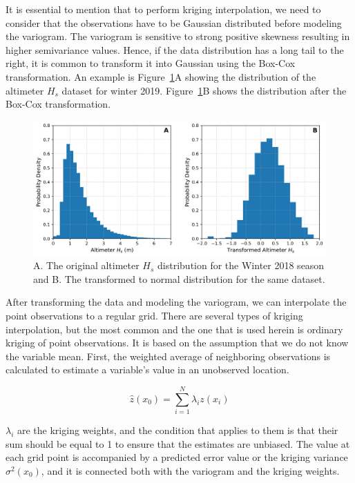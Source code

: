 It is essential to mention that to perform kriging interpolation, we need to consider that the observations have to be Gaussian distributed before modeling the variogram. The variogram is sensitive to strong positive skewness resulting in higher semivariance values. Hence, if the data distribution has a long tail to the right, it is common to transform it into Gaussian using the Box-Cox transformation. An example is Figure~\ref{fig:boxcox_transform}A showing the distribution of the altimeter $H_{s}$ dataset for winter 2019. Figure~\ref{fig:boxcox_transform}B shows the distribution after the Box-Cox transformation.


\begin{figure}[H]
\centering
\includegraphics[width=0.85\linewidth]{Figures/Chapter4/altimeter_transobs_swh.png}
\caption{A. The original altimeter $H_{s}$ distribution for the Winter 2018 season and B. The transformed to normal distribution for the same dataset.}
\label{fig:boxcox_transform}
\end{figure}



After transforming the data and modeling the variogram, we can interpolate the point observations to a regular grid. There are several types of kriging interpolation, but the most common and the one that is used herein is ordinary kriging of point observations. It is based on the assumption that we do not know the variable mean. First, the weighted average of neighboring observations is calculated to estimate a variable's value in an unobserved location.

\begin{equation}
\hat{z}(x_{0}) = \sum^{N}_{i=1} \lambda_{i} z(x_{i})
\label{eqn:kriging_interp}
\end{equation}


$\lambda_{i}$ are the kriging weights, and the condition that applies to them is that their sum should be equal to 1 to ensure that the estimates are unbiased. The value at each grid point is accompanied by a predicted error value or the kriging variance $\sigma^{2}(x_{0})$, and it is connected both with the variogram and the kriging weights.

